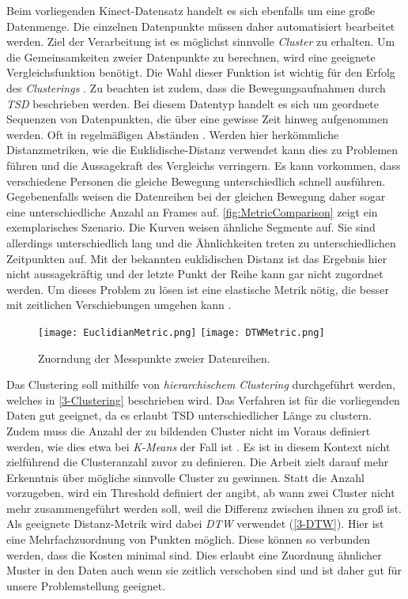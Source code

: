 Beim vorliegenden Kinect-Datensatz handelt es sich ebenfalls um eine große Datenmenge.
Die einzelnen Datenpunkte müssen daher automatisiert bearbeitet werden.
Ziel der Verarbeitung ist es möglichst sinnvolle \emph{Cluster} zu erhalten.
Um die Gemeinsamkeiten zweier Datenpunkte zu berechnen,
wird eine geeignete Vergleichsfunktion benötigt.
Die Wahl dieser Funktion ist wichtig für den Erfolg des \emph{Clusterings} \citep{warren_liao_clustering_2005}.
Zu beachten ist zudem, dass die Bewegungsaufnahmen durch \emph{\ac{TSD}} beschrieben werden.
Bei diesem Datentyp handelt es sich um geordnete Sequenzen von Datenpunkten,
die über eine gewisse Zeit hinweg aufgenommen werden.
Oft in regelmäßigen Abständen \citep{ali_clustering_2019}.
Werden hier herkömmliche Distanzmetriken, wie die Euklidische-Distanz verwendet
kann dies zu Problemen führen und die Aussagekraft des Vergleichs verringern.
Es kann vorkommen, dass verschiedene Personen die gleiche Bewegung unterschiedlich schnell ausführen.
Gegebenenfalls weisen die Datenreihen bei der gleichen Bewegung daher sogar eine unterschiedliche Anzahl an Frames auf.
\autoref{fig:MetricComparison} zeigt ein exemplarisches Szenario.
Die Kurven weisen ähnliche Segmente auf.
Sie sind allerdings unterschiedlich lang und die Ähnlichkeiten treten zu unterschiedlichen Zeitpunkten auf.
Mit der bekannten euklidischen Distanz ist das Ergebnis hier nicht aussagekräftig
und der letzte Punkt der Reihe kann gar nicht zugordnet werden.
Um dieses Problem zu lösen ist eine elastische Metrik nötig,
die besser mit zeitlichen Verschiebungen umgehen kann \citep{aghabozorgi_time-series_2015}.

\begin{figure}[ht]
    \begin{center}
    \texttt{[image: EuclidianMetric.png]}
    \texttt{[image: DTWMetric.png]}
    \end{center}
    \caption{Zuorndung der Messpunkte zweier Datenreihen.}
    \label{fig:MetricComparison}
\end{figure}

Das Clustering soll mithilfe von \emph{hierarchischem Clustering} durchgeführt werden,
welches in \autoref{3-Clustering} beschrieben wird.
Das Verfahren ist für die vorliegenden Daten gut geeignet,
da es erlaubt \ac{TSD} unterschiedlicher Länge zu clustern.
Zudem muss die Anzahl der zu bildenden Cluster nicht im Voraus definiert werden,
wie dies etwa bei \emph{K-Means} der Fall ist \citep{aghabozorgi_time-series_2015}.
Es ist in diesem Kontext nicht zielführend die Clusteranzahl zuvor zu definieren.
Die Arbeit zielt darauf mehr Erkenntnis über mögliche sinnvolle Cluster zu gewinnen.
Statt die Anzahl vorzugeben, wird ein Threshold definiert der angibt,
ab wann zwei Cluster nicht mehr zusammengeführt werden soll,
weil die Differenz zwischen ihnen zu groß ist.
Als geeignete Distanz-Metrik wird dabei \emph{\ac{DTW}} verwendet (\autoref{3-DTW}).
Hier ist eine Mehrfachzuordnung von Punkten möglich.
Diese können so verbunden werden, dass die Kosten minimal sind.
Dies erlaubt eine Zuordnung ähnlicher Muster in den Daten auch wenn sie zeitlich verschoben sind
und ist daher gut für unsere Problemstellung geeignet.